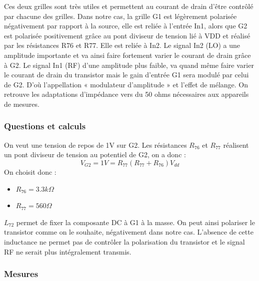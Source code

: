 \documentclass{article}
\begin{document}
Ces deux grilles sont très utiles et permettent au courant de drain d'être contrôlé par chacune des grilles. Dans notre cas, la grille G1 est légèrement polarisée négativement par rapport à la source, elle est reliée à l'entrée In1, alors que G2 est polarisée positivement grâce au pont diviseur de tension lié à VDD et réalisé par les résistances R76 et R77. Elle est reliée à In2.
Le signal In2 (LO) a une amplitude importante et va ainsi faire fortement varier le courant de drain grâce à G2. Le signal In1 (RF) d'une amplitude plus faible, va quand même faire varier le courant de drain du transistor mais le gain d'entrée G1 sera modulé par celui de G2. D'où l'appellation « modulateur d'amplitude » et l'effet de mélange.
On retrouve les adaptations d'impédance vers du 50 ohms nécessaires aux appareils de mesures.


\subsubsection{Questions et calculs}


On veut une tension de repos de 1V sur G2.
Les résistances $R_{76}$ et $R_{77}$ réalisent un pont diviseur de tension au potentiel de G2, on a donc :
\begin{equation*}
V_{G2}=1V={R_{77}}{(R_{77}+R_{76})}V_{dd}
\end{equation*}
On choisit donc :
\begin{itemize}
\item $R_{76}= 3.3 k \Omega$
\item $R_{77}= 560 \Omega$
\end{itemize}


$L_{72}$ permet de fixer la composante DC à G1 à la masse. On peut ainsi polariser le transistor comme on le souhaite, négativement dans notre cas. L'absence de cette inductance ne permet pas de contrôler la polarisation du transistor et le signal RF ne serait plus intégralement transmis.

\subsubsection{Mesures}

\end{document}
